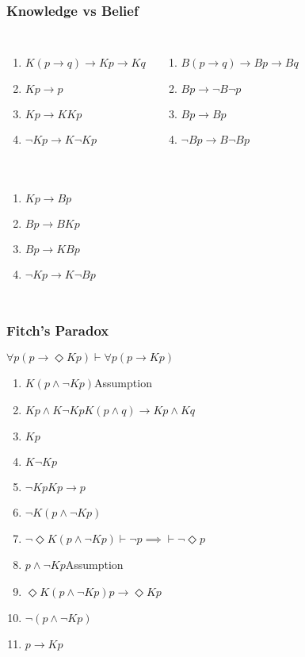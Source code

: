 \documentclass[UTF8,aspectratio=43,11pt,colorlinks,compress,openany]{beamer}%
\begin{document}
\begin{frame}\frametitle{Knowledge vs Belief}
\begin{columns}
\begin{enumerate}
	\item $K(p\to q)\to Kp\to Kq$
	\item $Kp\to p$
	\item $Kp\to KKp$
	\item $\neg Kp\to K\neg Kp$
\end{enumerate}
\begin{enumerate}
	\item $B(p\to q)\to Bp\to Bq$
	\item $Bp\to\neg B\neg p$
	\item $Bp\to Bp$
	\item $\neg Bp\to B\neg Bp$
\end{enumerate}
\end{columns}
\begin{columns}
\begin{enumerate}
	\item $Kp\to Bp$
	\item $Bp\to BKp$
	\item $Bp\to KBp$
	\item $\neg Kp\to K\neg Bp$
\end{enumerate}
\centerline{}
\end{columns}
\end{frame}

\begin{frame}\frametitle{Fitch's Paradox}\centering{}
	\begin{block}{$\forall p(p\to\Diamond Kp)\vdash\forall p(p\to Kp)$}
		\begin{enumerate}
			\item $K(p\wedge\neg Kp)$\hfill Assumption
			\item $Kp\wedge K\neg Kp$\hfill $K(p\wedge q)\to Kp\wedge Kq$
			\item $Kp$
			\item $K\neg Kp$
			\item $\neg Kp$\hfill $Kp\to p$
			\item $\neg K(p\wedge\neg Kp)$
			\item $\neg\Diamond K(p\wedge\neg Kp)$\hfill $\vdash\neg p\implies\vdash\neg\Diamond p$
			\item $p\wedge\neg Kp$\hfill Assumption
			\item $\Diamond K(p\wedge\neg Kp)$\hfill $p\to\Diamond Kp$
			\item $\neg(p\wedge\neg Kp)$
			\item $p\to Kp$
		\end{enumerate}
	\end{block}
\end{frame}
\end{document}
